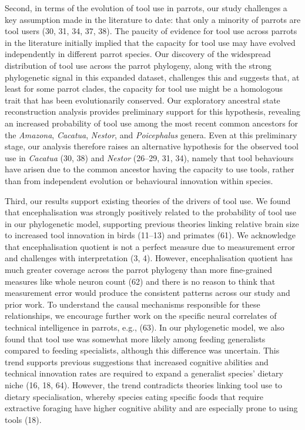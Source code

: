 \documentclass[
  man, donotrepeattitle,floatsintext]{apa6}
\begin{document}
Second, in terms of the evolution of tool use in parrots, our study challenges a
key assumption made in the literature to date: that only a minority of parrots
are tool users (30, 31, 34, 37, 38).
The paucity of evidence for tool use across parrots in the literature initially
implied that the capacity for tool use may have evolved independently in
different parrot species. Our discovery of the widespread distribution of tool
use across the parrot phylogeny, along with the strong phylogenetic signal in
this expanded dataset, challenges this and suggests that, at least for some
parrot clades, the capacity for tool use might be a homologous trait that has
been evolutionarily conserved. Our exploratory ancestral state reconstruction
analysis provides preliminary support for this hypothesis, revealing an
increased probability of tool use among the most recent common ancestors for the
\emph{Amazona}, \emph{Cacatua}, \emph{Nestor}, and \emph{Poicephalus} genera. Even at this
preliminary stage, our analysis therefore raises an alternative hypothesis for
the observed tool use in \emph{Cacatua} (30, 38) and
\emph{Nestor} (26--29, 31, 34), namely that tool behaviours have arisen due to the
common ancestor having the capacity to use tools, rather than from independent
evolution or behavioural innovation within species.

Third, our results support existing theories of the drivers of tool use. We
found that encephalisation was strongly positively related to the probability of
tool use in our phylogenetic model, supporting previous theories linking
relative brain size to increased tool innovation in birds (11--13) and primates (61). We acknowledge that
encephalisation quotient is not a perfect measure due to measurement error and
challenges with interpretation (3, 4). However, encephalisation
quotient has much greater coverage across the parrot phylogeny than more
fine-grained measures like whole neuron count (62) and there is no reason
to think that measurement error would produce the consistent patterns across our
study and prior work. To understand the causal mechanisms responsible for these
relationships, we encourage further work on the specific neural correlates of
technical intelligence in parrots, e.g., (63). In our phylogenetic
model, we also found that tool use was somewhat more likely among feeding
generalists compared to feeding specialists, although this difference was
uncertain. This trend supports previous suggestions that increased cognitive
abilities and technical innovation rates are required to expand a generalist
species' dietary niche (16, 18, 64). However, the trend contradicts theories linking tool use to
dietary specialisation, whereby species eating specific foods that require
extractive foraging have higher cognitive ability and are especially prone to
using tools (18).
\end{document}
